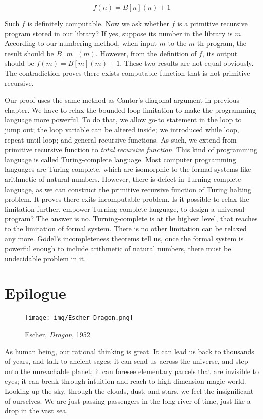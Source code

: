 \documentclass{article}
\begin{document}
\[
f(n) = B[n](n) + 1
\]

Such $f$ is definitely computable. Now we ask whether $f$ is a primitive recursive program stored in our library? If yes, suppose its number in the library is $m$. According to our numbering method, when input $m$ to the $m$-th program, the result should be $B[m](m)$. However, from the definition of $f$, its output should be $f(m) = B[m](m) + 1$. These two results are not equal obviously. The contradiction proves there exists computable function that is not primitive recursive.

Our proof uses the same method as Cantor's diagonal argument in previous chapter. We have to relax the bounded loop limitation to make the programming language more powerful. To do that, we allow go-to statement in the loop to jump out; the loop variable can be altered inside; we introduced while loop, repeat-until loop; and general recursive functions. As such, we extend from primitive recursive function to {\em total recursive function}. This kind of programming language is called Turing-complete language. Most computer programming languages are Turing-complete, which are isomorphic to the formal systems like arithmetic of natural numbers. However, there is defect in Turning-complete language, as we can construct the primitive recursive function of Turing halting problem. It proves there exits incomputable problem. Is it possible to relax the limitation further, empower Turning-complete language, to design a universal program? The answer is no. Turning-complete is at the highest level, that reaches to the limitation of formal system. There is no other limitation can be relaxed any more. Gödel's incompleteness theorems tell us, once the formal system is powerful enough to include arithmetic of natural numbers, there must be undecidable problem in it.

\section{Epilogue}

\begin{figure}
 \centering
 \texttt{[image: img/Escher-Dragon.png]}
 \caption{Escher, {\em Dragon}, 1952}
 \label{fig:Escher-Dragon}
\end{figure}

As human being, our rational thinking is great. It can lead us back to thousands of years, and talk to ancient sages; it can send us across the universe, and step onto the unreachable planet; it can foresee elementary parcels that are invisible to eyes; it can break through intuition and reach to high dimension magic world. Looking up the sky, through the clouds, dust, and stars, we feel the insignificant of ourselves. We are just passing passengers in the long river of time, just like a drop in the vast sea.
\end{document}
